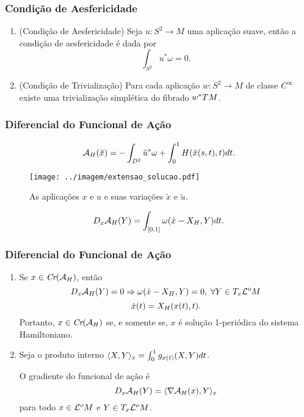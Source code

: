 \documentclass{beamer}
\begin{document}
	\begin{frame}
		\frametitle{Condição de Aesfericidade}
			\begin{enumerate}
				
				\item (Condição de Aesfericidade) Seja $u:S^{2} \to M$ uma aplicação suave, então a condição de aesfericidade é dada por 
				$$
				\int_{S^{2}} u^{*}\omega = 0.
				$$
				
				\item (Condição de Trivialização) 
				Para cada aplicação $w:S^{2}\to M$ de classe $C^{\infty}$ existe uma trivialização simplética do fibrado $w^{*}TM$.
				
			\end{enumerate}
	\end{frame}
	
	\begin{frame}
		\frametitle{Diferencial do Funcional de Ação}
			$$
			\mathcal{A}_{H}(\tilde{x}) = -\int_{D^{2}}\tilde{u}^{*}\omega + \int_{0}^{1}H(\tilde{x}(s,t),t)dt.
			$$
				\begin{figure}[!h]
					\centering
					\texttt{[image: ../imagem/extensao\_solucao.pdf]}
					\caption{As aplicações $x$ e $u$ e suas variações $\tilde{x}$ e $\tilde{u}$.}
					\label{figura_extensao_solucao}
				\end{figure}
		\begin{proposicao}
			$$
		D_{x}\mathcal{A}_{H}(Y) = \int_{[0,1]} \omega(\dot{x} - X_{H}, Y)dt.
		$$
		\end{proposicao}
		
	\end{frame}
	
	\begin{frame}
				\frametitle{Diferencial do Funcional de Ação}
		\begin{enumerate}
			\item 	Se $x \in \textit{Cr}(\mathcal{A}_{H})$, então
			$$
			D_{x}\mathcal{A}_{H}(Y) = 0 \Rightarrow \omega(\dot{x} - X_{H}, Y)=0,\; \forall Y \in T_{x}\mathcal{L}^{o}M
			$$
			$$
			\dot{x}(t) =X_{H}(x(t), t).
			$$
			Portanto, $x \in \textit{Cr}(\mathcal{A}_{H})$ se, e somente se, $x$ é solução 1-periódica do sistema Hamiltoniano. 
			
			\item Seja o produto interno $ \langle X, Y \rangle_{x} = \int_{0}^{1}g_{x(t)}(X, Y)dt$. 
			
			O gradiente do funcional de ação é 
			$$
			D_{x}\mathcal{A}_{H}(Y) = \langle \nabla \mathcal{A}_{H}(x), Y \rangle_{x}
			$$
			para todo $x \in \mathcal{L}^{o}M$ e $Y \in T_{x}\mathcal{L}^{o}M$.
		\end{enumerate}
		
	\end{frame}
	
\end{document}
